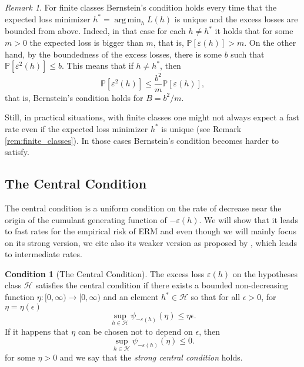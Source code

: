 \documentclass{uvamath}
\newcommand*{\calH}{\mathcal{H}}
\newcommand*{\calP}{\mathcal{P}}
\newcommand*{\bbP}{\mathbb{P}}
\DeclareMathOperator*{\argmin}{arg\,min}
\theoremstyle{remark}
\newtheorem{remark}[theorem]{Remark}
\theoremstyle{definition}
\theoremstyle{definition}
\theoremstyle{definition}
\theoremstyle{definition}
\theoremstyle{definition}
\newtheorem{condition}{Condition}
\begin{document}
\begin{remark}
  For finite classes Bernstein's condition holds every time that the
  expected loss minimizer $h^* = \argmin_{h} L(h)$ is unique and the
  excess losses are bounded from above. Indeed, in that case for each
  $h\neq h^*$ it holds that for some $m>0$ the expected loss is bigger
  than $m$, that is, $\bbP[\varepsilon(h)]>m$. On the other hand, by
  the boundedness of the excess losses, there is some $b$ such that
  $\bbP[\varepsilon^2(h)]\leq b$. This means that if $h\neq h^*$, then
  $$\bbP[\varepsilon^2(h)]\leq \frac{b^2}{m}\bbP[\varepsilon(h)],$$ that
  is, Bernstein's condition holds for $B = b^2/m$.

  Still, in practical situations, with finite classes one might not
  always expect a fast rate even if the expected loss minimizer $h^*$
  is unique (see Remark \ref{rem:finite_classes}). In those cases
  Bernstein's condition becomes harder to satisfy.
\end{remark}




\subsection{The Central Condition}

The central condition is a uniform condition on the rate of decrease
near the origin of the cumulant generating function of
$-\varepsilon(h)$. We will show that it leads to fast rates for the
empirical risk of ERM and even though we will mainly focus on its
strong version, we cite also its weaker version as proposed by
\citet{grunwald_fast_2016}, which leads to intermediate rates.


\begin{condition}[The Central Condition]\label{cond:central}
  The excess loss $\varepsilon(h)$ on the hypotheses class $\calH$
  satisfies the central condition if there exists a bounded
  non-decreasing function $\eta:[0,\infty)\to[0,\infty)$ and an
  element $h^*\in\calH$ so that for all $\epsilon>0$, for
  $\eta = \eta(\epsilon)$
  \begin{equation}\label{eq:def_central_condition}
    \sup_{h\in \calH}\psi_{-\varepsilon(h)}(\eta)\leq \eta\epsilon.
  \end{equation}
  If it happens that $\eta$ can be chosen not to depend on $\epsilon$,
  then
  \begin{equation*}
    \sup_{h\in \calH}\psi_{-\varepsilon(h)}(\eta)\leq 0.
  \end{equation*}
  for some $\eta>0$ and we say that the \textit{strong central
    condition} holds.
\end{condition}
\end{document}
